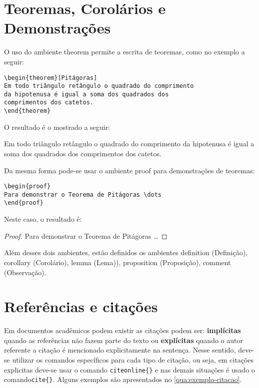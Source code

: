 \section{Teoremas, Corolários e Demonstrações}
\label{sec:teor}
 O uso do ambiente \textsf{theorem} permite a escrita de teoremas, como no exemplo a seguir:
\begin{verbatim}
\begin{theorem}[Pitágoras]
Em todo triângulo retângulo o quadrado do comprimento
da hipotenusa é igual a soma dos quadrados dos
comprimentos dos catetos.
\end{theorem}
\end{verbatim}

O resultado é o mostrado a seguir:

\begin{theorem}[Pitágoras]
Em todo triângulo retângulo o quadrado do comprimento da hipotenusa é igual a soma dos quadrados dos comprimentos dos catetos.
\end{theorem}

Da mesma forma pode-se usar o ambiente \textsf{proof} para demonstrações de teoremas:
\begin{verbatim}
\begin{proof}
Para demonstrar o Teorema de Pitágoras \dots
\end{proof}
\end{verbatim}

Neste caso, o resultado é:
\begin{proof}
Para demonstrar o Teorema de Pitágoras \dots
\end{proof}

Além desses dois ambientes, estão definidos os ambientes \textsf{definition} (Definição), \textsf{corollary} (Corolário), \textsf{lemma} (Lema)), \textsf{proposition} (Proposição), \textsf{comment} (Observação).

\section{Referências e citações}

Em documentos acadêmicos podem existir as citações podem ser: \textbf{implícitas} quando as referências não fazem parte do texto ou \textbf{explícitas} quando o autor referente a citação é mencionado explicitamente na sentença. Nesse sentido, deve-se utilizar os comandos específicos para cada tipo de citação, ou seja, em citações explicitas deve-se usar o comando \verb|citeonline{}| e nas demais situações é usado o comando\verb|cite{}|. Alguns exemplos são apresentados no \autoref{qua:exemplo-citacao}.

